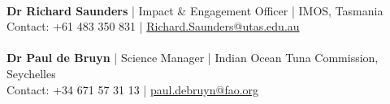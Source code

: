\documentclass[10pt,a4paper]{article}
\begin{document}
\\
\textbf{Dr Richard Saunders} | Impact \& Engagement Officer | IMOS, Tasmania\\
Contact: +61 483 350 831 | \href{mailto:Richard.Saunders@utas.edu.au}{Richard.Saunders@utas.edu.au}\\
\\
\noindent
\textbf{Dr Paul de Bruyn} | Science Manager | Indian Ocean Tuna Commission, Seychelles\\
Contact: +34 671 57 31 13 | \href{mailto:paul.debruyn@fao.org}{paul.debruyn@fao.org}\\
\end{document}

